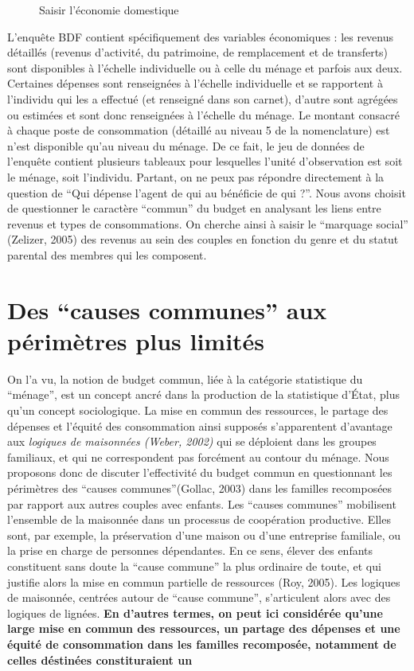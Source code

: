 \documentclass[
  12pt,
]{book}
\begin{document}
\begin{figure}
\begin{tikzpicture}[x=0.75pt,y=0.75pt,yscale=-1,xscale=1]
\end{tikzpicture}

\caption{Saisir l'économie domestique}
\end{figure}

L'enquête BDF contient spécifiquement des variables économiques : les
revenus détaillés (revenus d'activité, du patrimoine, de remplacement et
de transferts) sont disponibles à l'échelle individuelle ou à celle du
ménage et parfois aux deux. Certaines dépenses sont renseignées à
l'échelle individuelle et se rapportent à l'individu qui les a effectué
(et renseigné dans son carnet), d'autre sont agrégées ou estimées et
sont donc renseignées à l'échelle du ménage. Le montant consacré à
chaque poste de consommation (détaillé au niveau 5 de la nomenclature)
est n'est disponible qu'au niveau du ménage. De ce fait, le jeu de
données de l'enquête contient plusieurs tableaux pour lesquelles l'unité
d'observation est soit le ménage, soit l'individu. Partant, on ne peux
pas répondre directement à la question de ``Qui dépense l'agent de qui
au bénéficie de qui ?''. Nous avons choisit de questionner le caractère
``commun'' du budget en analysant les liens entre revenus et types de
consommations. On cherche ainsi à saisir le ``marquage social''
(Zelizer, 2005) des revenus au sein des couples en fonction du genre et
du statut parental des membres qui les composent.

\section{Des ``causes communes'' aux périmètres plus
limités}\label{des-causes-communes-aux-puxe9rimuxe8tres-plus-limituxe9s}

On l'a vu, la notion de budget commun, liée à la catégorie statistique
du ``ménage'', est un concept ancré dans la production de la statistique
d'État, plus qu'un concept sociologique. La mise en commun des
ressources, le partage des dépenses et l'équité des consommation ainsi
supposés s'apparentent d'avantage aux \emph{logiques de maisonnées
(Weber, 2002)} qui se déploient dans les groupes familiaux, et qui ne
correspondent pas forcément au contour du ménage. Nous proposons donc de
discuter l'effectivité du budget commun en questionnant les périmètres
des ``causes communes''(Gollac, 2003) dans les familles recomposées par
rapport aux autres couples avec enfants. Les ``causes communes''
mobilisent l'ensemble de la maisonnée dans un processus de coopération
productive. Elles sont, par exemple, la préservation d'une maison ou
d'une entreprise familiale, ou la prise en charge de personnes
dépendantes. En ce sens, élever des enfants constituent sans doute la
``cause commune'' la plus ordinaire de toute, et qui justifie alors la
mise en commun partielle de ressources (Roy, 2005). Les logiques de
maisonnée, centrées autour de ``cause commune'', s'articulent alors avec
des logiques de lignées. \textbf{En d'autres termes, on peut ici
considérée qu'une large mise en commun des ressources, un partage des
dépenses et une équité de consommation dans les familles recomposée,
notamment de celles déstinées constituraient un}
\end{document}
